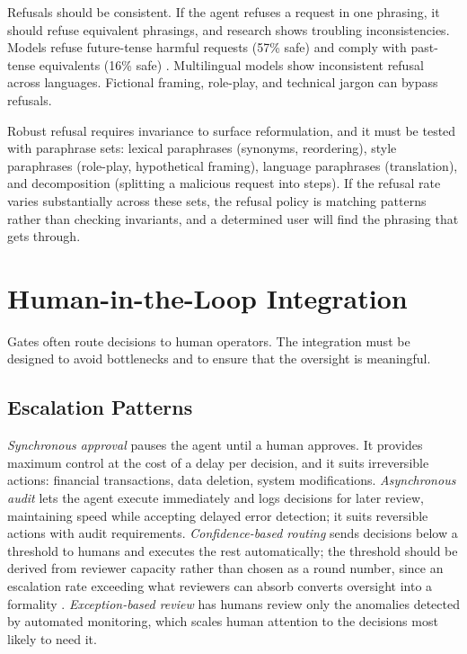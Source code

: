 \documentclass[11pt]{book}
\begin{document}
Refusals should be consistent. If the agent refuses a request in one phrasing, it should refuse equivalent phrasings, and research shows troubling inconsistencies. Models refuse future-tense harmful requests (57\% safe) and comply with past-tense equivalents (16\% safe) \cite{andriushchenko2025temporal}. Multilingual models show inconsistent refusal across languages. Fictional framing, role-play, and technical jargon can bypass refusals.

Robust refusal requires invariance to surface reformulation, and it must be tested with paraphrase sets: lexical paraphrases (synonyms, reordering), style paraphrases (role-play, hypothetical framing), language paraphrases (translation), and decomposition (splitting a malicious request into steps). If the refusal rate varies substantially across these sets, the refusal policy is matching patterns rather than checking invariants, and a determined user will find the phrasing that gets through.

\section{Human-in-the-Loop Integration}

Gates often route decisions to human operators. The integration must be designed to avoid bottlenecks and to ensure that the oversight is meaningful.

\subsection{Escalation Patterns}

\textit{Synchronous approval} pauses the agent until a human approves. It provides maximum control at the cost of a delay per decision, and it suits irreversible actions: financial transactions, data deletion, system modifications. \textit{Asynchronous audit} lets the agent execute immediately and logs decisions for later review, maintaining speed while accepting delayed error detection; it suits reversible actions with audit requirements. \textit{Confidence-based routing} sends decisions below a threshold to humans and executes the rest automatically; the threshold should be derived from reviewer capacity rather than chosen as a round number, since an escalation rate exceeding what reviewers can absorb converts oversight into a formality \cite{oversightcap2026}. \textit{Exception-based review} has humans review only the anomalies detected by automated monitoring, which scales human attention to the decisions most likely to need it.
\end{document}
